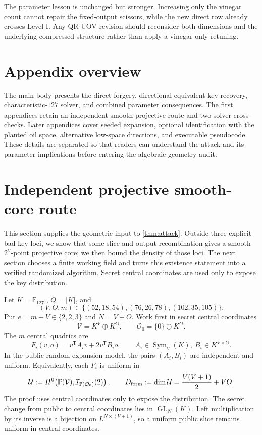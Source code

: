 \documentclass[11pt,a4paper]{article}
\theoremstyle{definition}
\theoremstyle{remark}
\newcommand{\F}{\mathbb F}
\newcommand{\PP}{\mathbb P}
\newcommand{\cO}{\mathcal O}
\newcommand{\cU}{\mathcal U}
\newcommand{\cV}{\mathcal V}
\newcommand{\Sym}{\operatorname{Sym}}
\begin{document}
The parameter lesson is unchanged but stronger.  Increasing only the vinegar
count cannot repair the fixed-output scissors, while the new direct row already
crosses Level I.  Any QR-UOV revision should reconsider both dimensions and the
underlying compressed structure rather than apply a vinegar-only retuning.

\section*{Appendix overview}
The main body presents the direct forgery, directional equivalent-key recovery, characteristic-$127$ solver, and combined parameter consequences.  The first appendices retain an independent smooth-projective route and two solver cross-checks.  Later appendices cover seeded expansion, optional identification with the planted oil space, alternative low-space directions, and executable pseudocode.  These details are separated so that readers can understand the attack and its parameter implications before entering the algebraic-geometry audit.

\section{Independent projective smooth-core route}\label{sec:projective}

This section supplies the geometric input to \cref{thm:attack}.  Outside three explicit bad key loci, we show that some slice and output recombination gives a smooth $2^V$-point projective core; we then bound the density of those loci.  The next section chooses a finite working field and turns this existence statement into a verified randomized algorithm.  Secret central coordinates are used only to expose the key distribution.

Let $K=\F_{127^3}$, $Q=|K|$, and
\[
(V,O,m)\in\{(52,18,54),(76,26,78),(102,35,105)\}.
\]
Put $e=m-V\in\{2,2,3\}$ and $N=V+O$.  Work first in secret central coordinates
\[
\cV=K^V\oplus K^O,
\qquad
\cO_0=\{0\}\oplus K^O.
\]
The $m$ central quadrics are
\begin{equation}\label{eq:central-slice}
F_i(v,o)=v^{\mathsf T}A_i v+2v^{\mathsf T}B_i o,
\qquad
A_i\in\Sym_V(K),\ B_i\in K^{V\times O}.
\end{equation}
In the public-random expansion model, the pairs $(A_i,B_i)$ are independent and uniform.  Equivalently, each $F_i$ is uniform in
\[
\cU:=H^0\!\left(\PP(\cV),\mathcal I_{\PP(\cO_0)}(2)\right),
\qquad
D_{\rm form}:=\dim\cU=\frac{V(V+1)}2+VO.
\]
The proof uses central coordinates only to expose the distribution.  The secret change from public to central coordinates lies in $\operatorname{GL}_N(K)$.  Left multiplication by its inverse is a bijection on $L^{N\times(V+1)}$, so a uniform public slice remains uniform in central coordinates.
\end{document}
